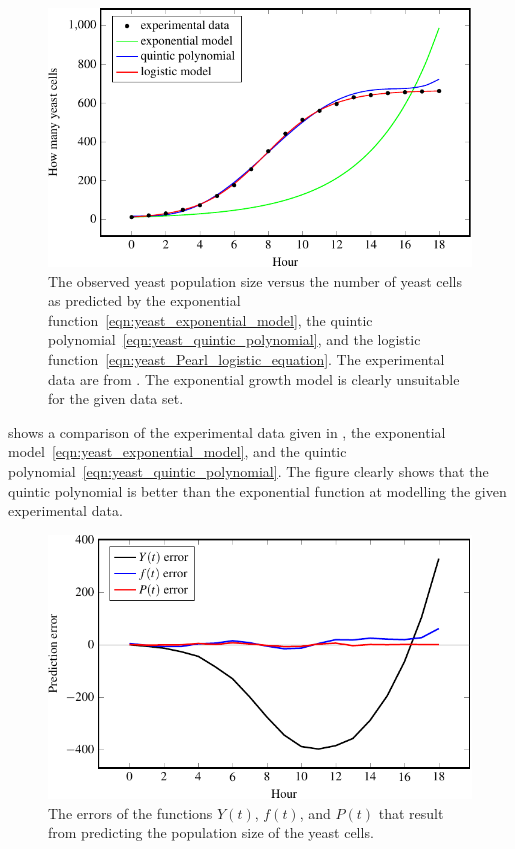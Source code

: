 \documentclass[a4paper,oneside,12pt]{article}
\begin{document}
\begin{problem}
{\begin{solution}
\begin{figure}[!htbp]
\centering
\includegraphics[scale=1.1]{image/11/yeast.pdf}
\caption{%
  The observed yeast population size versus the number of yeast cells
  as predicted by the exponential
  function~\eqref{eqn:yeast_exponential_model}, the quintic
  polynomial~\eqref{eqn:yeast_quintic_polynomial}, and the logistic
  function~\eqref{eqn:yeast_Pearl_logistic_equation}.  The
  experimental data are from .  The exponential
  growth model is clearly unsuitable for the given data set.
}
\label{fig:yeast_data_versus_models}
\end{figure}

 shows a comparison of the
experimental data given in , the exponential
model~\eqref{eqn:yeast_exponential_model}, and the quintic
polynomial~\eqref{eqn:yeast_quintic_polynomial}.  The figure clearly
shows that the quintic polynomial is better than the exponential
function at modelling the given experimental data.

\begin{figure}[!htbp]
\centering
\includegraphics[scale=1.1]{image/11/yeast-error.pdf}
\caption{%
  The errors of the functions $Y(t)$, $f(t)$, and $P(t)$ that result
  from predicting the population size of the yeast cells.
}
\label{fig:yeast_error_analysis}
\end{figure}


\end{solution}}
\end{problem}
\end{document}
